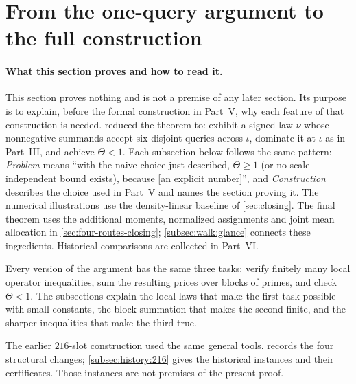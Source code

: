 \section{From the one-query argument to the full construction}\label{sec:design-walk}

\paragraph{What this section proves and how to read it.}
This section proves nothing and is not a premise of any later
section. Its purpose is to explain, before the formal construction in
Part~V, why each feature of that construction is needed.
 reduced the theorem to: exhibit a signed law
$\nu$ whose nonnegative summands accept six disjoint queries across
$\iota$, dominate it at $\iota$ as in Part~III, and achieve
$\Theta<1$. Each subsection below follows the same pattern:
\emph{Problem} means ``with the naive choice just described,
$\Theta\ge1$ (or no scale-independent bound exists), because [an
explicit number]'', and \emph{Construction} describes the choice
used in Part~V and names the section proving it. The numerical illustrations use the density-linear baseline of
\cref{sec:closing}. The final theorem uses the additional moments,
normalized assignments and joint mean allocation in
\cref{sec:four-routes-closing}; \cref{subsec:walk:glance} connects
these ingredients. Historical comparisons are collected in Part~VI.

Every version of the argument has the same three tasks: verify
finitely many local operator inequalities, sum the resulting prices
over blocks of primes, and check $\Theta<1$. The subsections explain
the local laws that make the first task possible with small
constants, the block summation that makes the second finite, and the
sharper inequalities that make the third true.

The earlier $216$-slot construction used the same general tools.
 records the four structural changes;
\cref{subsec:history:216} gives the historical instances and their
certificates. Those instances are not premises of the present proof.

